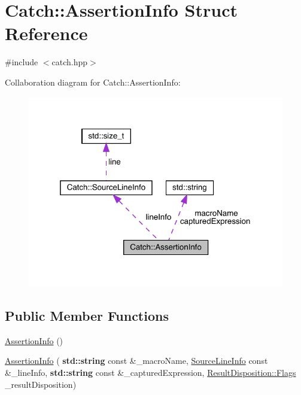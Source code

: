 \hypertarget{struct_catch_1_1_assertion_info}{}\section{Catch\+:\+:Assertion\+Info Struct Reference}
\label{struct_catch_1_1_assertion_info}


{\ttfamily \#include $<$catch.\+hpp$>$}



Collaboration diagram for Catch\+:\+:Assertion\+Info\+:
\nopagebreak
\begin{figure}[H]
\begin{center}
\leavevmode
\includegraphics[width=319pt]{struct_catch_1_1_assertion_info__coll__graph}
\end{center}
\end{figure}
\subsection*{Public Member Functions}
\begin{DoxyCompactItemize}
\item 
\hyperlink{struct_catch_1_1_assertion_info_a15c29d306c86361f842a0351a6003b9f}{Assertion\+Info} ()
\item 
\hyperlink{struct_catch_1_1_assertion_info_aaf6cc3eebd40391e54d37ed42953c73f}{Assertion\+Info} (\textbf{ std\+::string} const \&\+\_\+macro\+Name, \hyperlink{struct_catch_1_1_source_line_info}{Source\+Line\+Info} const \&\+\_\+line\+Info, \textbf{ std\+::string} const \&\+\_\+captured\+Expression, \hyperlink{struct_catch_1_1_result_disposition_a3396cad6e2259af326b3aae93e23e9d8}{Result\+Disposition\+::\+Flags} \+\_\+result\+Disposition)
\end{DoxyCompactItemize}
